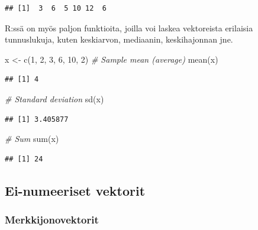 \documentclass[
]{book}
\newenvironment{Shaded}{\begin{snugshade}}{\end{snugshade}}
\newcommand{\CommentTok}[1]{\textcolor[rgb]{0.56,0.35,0.01}{\textit{#1}}}
\newcommand{\DecValTok}[1]{\textcolor[rgb]{0.00,0.00,0.81}{#1}}
\newcommand{\FunctionTok}[1]{\textcolor[rgb]{0.00,0.00,0.00}{#1}}
\newcommand{\NormalTok}[1]{#1}
\newcommand{\OtherTok}[1]{\textcolor[rgb]{0.56,0.35,0.01}{#1}}
\begin{document}
\begin{verbatim}
## [1]  3  6  5 10 12  6
\end{verbatim}

R:ssä on myös paljon funktioita, joilla voi laskea vektoreista erilaisia tunnuslukuja, kuten keskiarvon, mediaanin, keskihajonnan jne.

\begin{Shaded}
\begin{Highlighting}[]
\NormalTok{x }\OtherTok{\textless{}{-}} \FunctionTok{c}\NormalTok{(}\DecValTok{1}\NormalTok{, }\DecValTok{2}\NormalTok{, }\DecValTok{3}\NormalTok{, }\DecValTok{6}\NormalTok{, }\DecValTok{10}\NormalTok{, }\DecValTok{2}\NormalTok{)}
\CommentTok{\# Sample mean (average)}
\FunctionTok{mean}\NormalTok{(x)}
\end{Highlighting}
\end{Shaded}

\begin{verbatim}
## [1] 4
\end{verbatim}

\begin{Shaded}
\begin{Highlighting}[]
\CommentTok{\# Standard deviation}
\FunctionTok{sd}\NormalTok{(x)}
\end{Highlighting}
\end{Shaded}

\begin{verbatim}
## [1] 3.405877
\end{verbatim}

\begin{Shaded}
\begin{Highlighting}[]
\CommentTok{\# Sum}
\FunctionTok{sum}\NormalTok{(x)}
\end{Highlighting}
\end{Shaded}

\begin{verbatim}
## [1] 24
\end{verbatim}

\hypertarget{ei-numeeriset-vektorit}{%
\subsection{Ei-numeeriset vektorit}\label{ei-numeeriset-vektorit}}

\hypertarget{merkkijonovektorit}{%
\subsubsection{Merkkijonovektorit}\label{merkkijonovektorit}}
\end{document}

